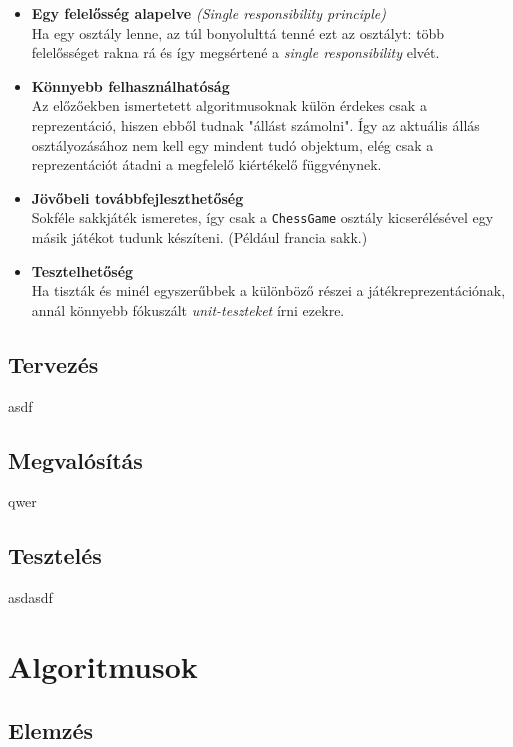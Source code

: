 \documentclass[twoside, a4paper, 12pt]{article}
\begin{document}
\begin{itemize}
	\item \textbf{Egy felelősség alapelve} \textit{(Single responsibility principle)}\cite{SingleResponsibilityHu}~\cite{SingleResponsibilityEn}~\cite{SOLID}~ \\
	Ha egy osztály lenne, az túl bonyolulttá tenné ezt az osztályt: több felelősséget rakna rá és így megsértené a \textit{single responsibility} elvét.
	\item \textbf{Könnyebb felhasználhatóság} \\
	Az előzőekben ismertetett algoritmusoknak külön érdekes csak a reprezentáció, hiszen ebből tudnak "állást számolni". Így az aktuális állás osztályozásához nem kell egy mindent tudó objektum, elég csak a reprezentációt átadni a megfelelő kiértékelő függvénynek.
	\item \textbf{Jövőbeli továbbfejleszthetőség} \\
	Sokféle sakkjáték ismeretes, így csak a \texttt{ChessGame} osztály kicserélésével egy másik játékot tudunk készíteni. (Például francia sakk.)
	\item \textbf{Tesztelhetőség} \\
	Ha tiszták és minél egyszerűbbek a különböző részei a játékreprezentációnak, annál könnyebb fókuszált \textit{unit-teszteket} írni ezekre.
\end{itemize}

\subsection{Tervezés}
asdf

\subsection{Megvalósítás}
qwer

\subsection{Tesztelés}

asdasdf











\section{Algoritmusok}
\subsection{Elemzés}
\end{document}
